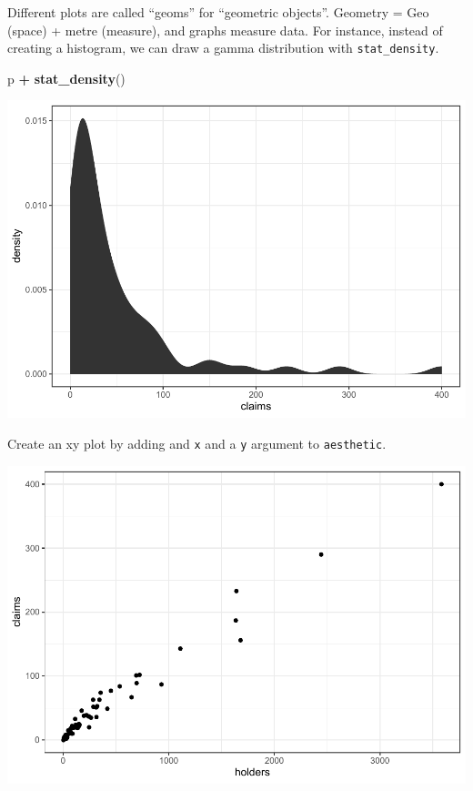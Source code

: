 \documentclass[
  openany]{book}
\newenvironment{Shaded}{\begin{snugshade}}{\end{snugshade}}
\newcommand{\DataTypeTok}[1]{\textcolor[rgb]{0.13,0.29,0.53}{#1}}
\newcommand{\KeywordTok}[1]{\textcolor[rgb]{0.13,0.29,0.53}{\textbf{#1}}}
\newcommand{\NormalTok}[1]{#1}
\newcommand{\OperatorTok}[1]{\textcolor[rgb]{0.81,0.36,0.00}{\textbf{#1}}}
\newcommand{\StringTok}[1]{\textcolor[rgb]{0.31,0.60,0.02}{#1}}
\begin{document}
Different plots are called ``geoms'' for ``geometric objects''. Geometry = Geo (space) + metre (measure), and graphs measure data. For instance, instead of creating a histogram, we can draw a gamma distribution with \texttt{stat\_density}.

\begin{Shaded}
\begin{Highlighting}[]
\NormalTok{p }\OperatorTok{+}\StringTok{ }\KeywordTok{stat_density}\NormalTok{()}
\end{Highlighting}
\end{Shaded}

\includegraphics{04-visualization_files/figure-latex/unnamed-chunk-5-1.pdf}

Create an xy plot by adding and \texttt{x} and a \texttt{y} argument to \texttt{aesthetic}.

\begin{Shaded}
\end{Shaded}

\includegraphics{04-visualization_files/figure-latex/unnamed-chunk-6-1.pdf}
\end{document}
